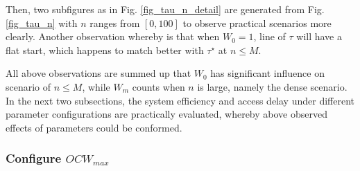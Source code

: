 \documentclass[journal]{IEEEtran}
\begin{document}
Then, two subfigures as in Fig. \ref{fig_tau_n_detail} are generated from Fig. \ref{fig_tau_n} with $n$ ranges from $[0,100]$ to observe practical scenarios more clearly. 
Another observation whereby is that when $W_0=1$, line of $\tau$ will have a flat start, which happens to match better with $\tau^\star$ at $n\leq M$.

All above observations are summed up that $W_0$ has significant influence on scenario of $n\leq M$, while $W_m$ counts when $n$ is large, namely the dense scenario. 
In the next two subsections, the system efficiency and access delay under different parameter configurations are practically evaluated, whereby above observed effects of parameters could be conformed.



\subsubsection{Configure $OCW_{max}$}
\end{document}
